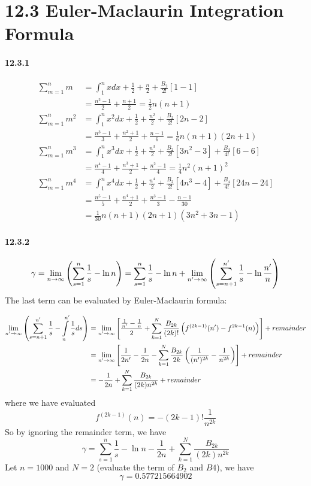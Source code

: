\documentclass[a4paper]{article}
\begin{document}
\section*{12.3 Euler-Maclaurin Integration Formula}

\paragraph{12.3.1}
\begin{equation*}
    \begin{split}
        \sum_{m=1}^n m &= \int_1^n xdx+\frac{1}{2}+\frac{n}{2}+\frac{B_2}{2!}[1-1]\\
        & =\frac{n^2-1}{2}+\frac{n+1}{2}=\frac{1}{2}n(n+1)\\
        \sum_{m=1}^n m^2 & =\int_1^n x^2 dx+\frac{1}{2}+\frac{n^2}{2}+\frac{B_2}{2!}[2n-2]\\
        & =\frac{n^3-1}{3}+\frac{n^2+1}{2}+\frac{n-1}{6}=\frac{1}{6}n(n+1)(2n+1)\\
        \sum_{m=1}^n m^3 & =\int_1^n x^3dx+\frac{1}{2}+\frac{n^3}{2}+\frac{B_2}{2!}[3n^2-3]+\frac{B_4}{4!}[6-6]\\
        & =\frac{n^4-1}{4}+\frac{n^3+1}{2}+\frac{n^2-1}{4}=\frac{1}{4}n^2(n+1)^2\\
        \sum_{m=1}^n m^4 & =\int_1^n x^4 dx+\frac{1}{2}+\frac{n^4}{2}+\frac{B_2}{2!}[4n^3-4]+\frac{B_4}{4!}[24n-24]\\
        & =\frac{n^5-1}{5}+\frac{n^4+1}{2}+\frac{n^3-1}{3}-\frac{n-1}{30}\\
        & =\frac{1}{30}n(n+1)(2n+1)(3n^2+3n-1)
    \end{split}
\end{equation*}

\paragraph{12.3.2}
\[
\gamma=\lim_{n\to\infty}\left(\sum_{s=1}^n\frac{1}{s}-\ln n\right)=\sum_{s=1}^n\frac{1}{s}-\ln n+\lim_{n'\to\infty}\left(\sum_{s=n+1}^{n'}\frac{1}{s}-\ln\frac{n'}{n}\right)
\]
The last term can be evaluated by Euler-Maclaurin formula:

\begin{equation*}
    \begin{split}
        \lim_{n'\to\infty}\left(\sum_{s=n+1}^{n'}\frac{1}{s}-\int\displaylimits_{n}^{n'}\frac{1}{s}ds\right) & =\lim_{n'\to\infty}\left[\frac{\frac{1}{n'}-\frac{1}{n}}{2}+\sum_{k=1}^N\frac{B_{2k}}{(2k)!}\left(f^{(2k-1)}(n')-f^{2k-1}(n) \right) \right]+remainder\\
        & =\lim_{n'\to\infty}\left[\frac{1}{2n'}-\frac{1}{2n}-\sum_{k=1}^N\frac{B_{2k}}{2k}\left(\frac{1}{(n')^{2k}}-\frac{1}{n^{2k}} \right) \right]+remainder\\
        & =-\frac{1}{2n}+\sum_{k=1}^N\frac{B_{2k}}{(2k)n^{2k}}+remainder
    \end{split}
\end{equation*}
where we have evaluated 
\[
f^{(2k-1)}(n)=-(2k-1)!\frac{1}{n^{2k}}
\]
So by ignoring the remainder term, we have
\[
\gamma=\sum_{s=1}^n\frac{1}{s}-\ln n-\frac{1}{2n}+\sum_{k=1}^N\frac{B_{2k}}{(2k)n^{2k}}
\]
Let $n=1000$ and $N=2$ (evaluate the term of $B_2$ and $B4$), we have
\[
\gamma=0.577215664902
\]
\end{document}
